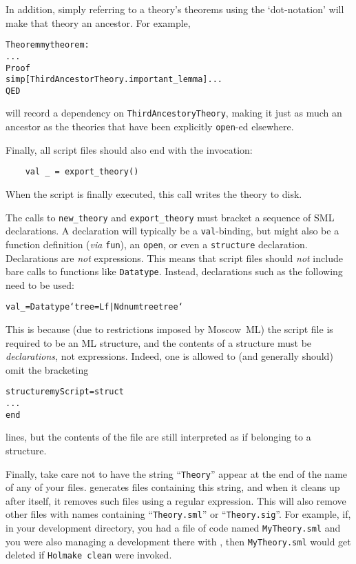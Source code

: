 In addition, simply referring to a theory's theorems using the `dot-notation' will make that theory an ancestor.
For example,
\begin{alltt}
   Theorem mytheorem:
     ...
   Proof
     simp[ThirdAncestorTheory.important_lemma] ...
   QED
\end{alltt}
will record a dependency on \texttt{ThirdAncestoryTheory}, making it just as much an ancestor as the theories that have been explicitly \texttt{open}-ed elsewhere.

Finally, all script files should also end with the invocation:
\begin{verbatim}
    val _ = export_theory()
\end{verbatim}
When the script is finally executed, this call writes the theory to disk.

The calls to \texttt{new_theory} and \texttt{export_theory} must bracket a sequence of SML declarations.
A declaration will typically be a \texttt{val}-binding, but might also be a function definition (\emph{via} \texttt{fun}), an \texttt{open}, or even a \texttt{structure} declaration.
Declarations are \emph{not} expressions.
This means that script files should \emph{not} include bare calls to \HOL{} functions like \texttt{Datatype}.
Instead, declarations such as the following need to be used:
\begin{alltt}
    val _ = Datatype`tree = Lf | Nd num tree tree`
\end{alltt}
This is because (due to restrictions imposed by Moscow~ML) the script file is required to be an ML structure, and the contents of a structure must be \emph{declarations}, not expressions.
Indeed, one is allowed to (and generally should) omit the bracketing
\begin{alltt}
  structure myScript = struct
  ...
  end
\end{alltt}
lines, but the contents of the file are still interpreted as if belonging to a structure.

Finally, take care not to have the string ``\texttt{Theory}'' appear at the end of the name of any of your files.
\HOL{} generates files containing this string, and when it cleans up after itself, it removes such files using a regular expression.
This will also remove other files with names containing ``\texttt{Theory.sml}'' or ``\texttt{Theory.sig}''.
For example, if, in your development directory, you had a file of \ML{} code named \texttt{MyTheory.sml} and you were also managing a \HOL{} development there with \holmake, then \texttt{MyTheory.sml} would get deleted if \texttt{Holmake~clean} were invoked.

